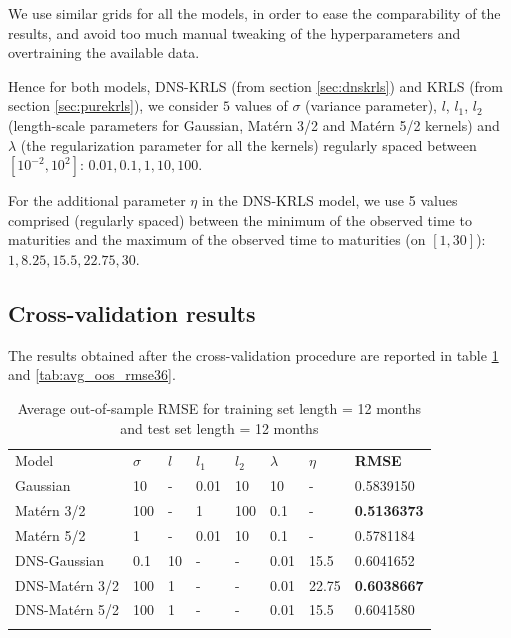 \medskip

We use similar grids for all the models, in order to ease the comparability of the results, and avoid too much manual tweaking of the hyperparameters and overtraining the available data. 

\medskip

Hence for both models, DNS-KRLS (from section \ref{sec:dnskrls}) and KRLS (from section \ref{sec:purekrls}), we consider $5$ values of $\sigma$ (variance parameter), $l$, $l_1$, $l_2$ (length-scale parameters for Gaussian, Mat\'ern 3/2 and Mat\'ern 5/2 kernels) and $\lambda$ (the regularization parameter for all the kernels) regularly spaced between $\left[ 10^{-2}, 10^2\right]$: $0.01, 0.1, 1, 10, 100$. 

\medskip

For the additional parameter $\eta$ in the DNS-KRLS model, we use 5 values comprised (regularly spaced) between the minimum of the observed time to maturities  and the maximum of the observed time to maturities (on $\left[1, 30\right]$): $1, 8.25, 15.5, 22.75, 30$.


\subsection{Cross-validation results}

The results obtained after the cross-validation procedure are reported in table \ref{tab:avg_oos_rmse12} and \ref{tab:avg_oos_rmse36}. 

\begin{table}[!htb]
\begin{center}
\caption{Average out-of-sample RMSE for training set length = 12 months and test set length = 12 months}
\label{tab:avg_oos_rmse12}       %
\begin{tabular}{llllllll}
\hline\noalign{\smallskip}
Model              & $\sigma$ & $l$ & $l_1$ & $l_2$  & $\lambda$  & $\eta$  & \textbf{RMSE}  \\
\noalign{\smallskip}\hline\noalign{\smallskip}
  Gaussian         &    10 &  - &   0.01&    10 &    10 & - & 0.5839150 \\
  Mat\'ern 3/2     &   100 &  - & 1 & 100 &   0.1 & - & \textbf{0.5136373}\\
  Mat\'ern 5/2     &   1 & - & 0.01 & 10 & 0.1 & - & 0.5781184\\
\noalign{\smallskip}\hline\noalign{\smallskip}
  DNS-Gaussian     & 0.1 & 10 & - & - & 0.01 & 15.5 & 0.6041652\\
  DNS-Mat\'ern 3/2 & 100 & 1 & - & - & 0.01 & 22.75 & \textbf{0.6038667}\\
  DNS-Mat\'ern 5/2 & 100 & 1 & - & - & 0.01 & 15.5 & 0.6041580\\
\noalign{\smallskip}\hline
\end{tabular}
\end{center}
\end{table}

